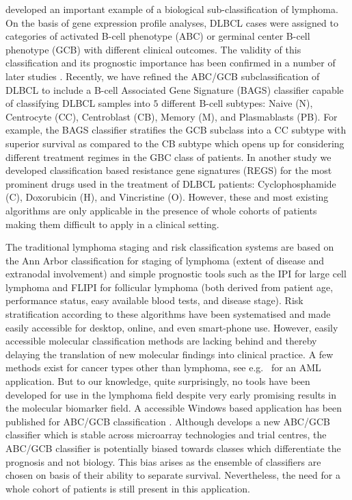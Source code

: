 \documentclass{article}
\begin{document}
\citet{Alizadeh2000} developed an important example of a biological sub-classification of lymphoma.
On the basis of gene expression profile analyses, DLBCL cases were assigned to categories of activated B-cell phenotype (ABC) or germinal center B-cell phenotype (GCB) with different clinical outcomes.
The validity of this classification and its prognostic importance has been confirmed in a number of later studies \citep{Rosenwald2002a,Hans2004,Poulsen2005,Lenz2008a,Monti2012a}.
Recently, we have refined the ABC/GCB subclassification of DLBCL to include a B-cell Associated Gene Signature (BAGS) classifier \citep{DybkaerBoegsted2015} capable of classifying DLBCL samples into $5$ different B-cell subtypes:
Naive (N), Centrocyte (CC), Centroblast (CB), Memory (M), and Plasmablasts (PB).
For example, the BAGS classifier stratifies the GCB subclass into a CC subtype with superior survival as compared to the CB subtype \citep{DybkaerBoegsted2015} which opens up for considering different treatment regimes in the GBC class of patients.
In another study \citep{Falgreen2015} we developed classification based resistance gene signatures (REGS) for the most prominent drugs used in the treatment of DLBCL patients:
Cyclophosphamide (C), Doxorubicin (H), and Vincristine (O).
However, these and most existing algorithms are only applicable in the presence of whole cohorts of patients making them difficult to apply in a clinical setting.

The traditional lymphoma staging and risk classification systems are based on the Ann Arbor classification for staging of lymphoma (extent of disease and extranodal involvement) and simple prognostic tools such as the IPI for large cell lymphoma and FLIPI for follicular lymphoma (both derived from patient age, performance status, easy available blood tests, and disease stage).
Risk stratification according to these algorithms have been systematised and made easily accessible for desktop, online, and even smart-phone use.
However, easily accessible molecular classification methods are lacking behind and thereby delaying the translation of new molecular findings into clinical practice.
A few methods exist for cancer types other than lymphoma, see e.g.\ \citep{Huang2009} for an AML application.
But to our knowledge, quite surprisingly, no tools have been developed for use in the lymphoma field despite very early promising results in the molecular biomarker field.
A accessible Windows based application has been published for ABC/GCB classification \citep{Care2013}.
Although \citet{Care2013} develops a new ABC/GCB classifier which is stable across microarray technologies and trial centres, the ABC/GCB classifier is potentially biased towards classes which differentiate the prognosis and not biology.
This bias arises as the ensemble of classifiers are chosen on basis of their ability to separate survival.
Nevertheless, the need for a whole cohort of patients is still present in this application.
\end{document}
